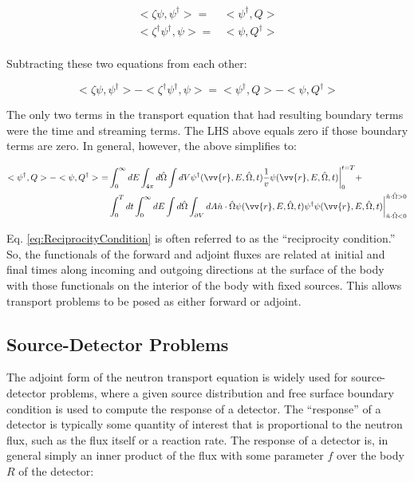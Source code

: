 \documentclass[10pt]{article}
\newcommand{\hO}{\hat{\Omega}}
\newcommand{\spa}{(\vv{r}, E, \hO, t)}
\begin{document}
\begin{flushleft}
\begin{equation}
\begin{aligned}
<\zeta\psi,\psi^\dagger>=& <\psi^\dagger,Q>\\
<\zeta^\dagger\psi^\dagger,\psi>=& <\psi,Q^\dagger>\\
\end{aligned}
\end{equation}
 
 Subtracting these two equations from each other:
 
 \begin{equation}
 <\zeta\psi,\psi^\dagger>-<\zeta^\dagger\psi^\dagger,\psi>=<\psi^\dagger,Q>-<\psi,Q^\dagger>
 \end{equation}

The only two terms in the transport equation that had resulting boundary terms were the time and streaming terms. The LHS above equals zero if those boundary terms are zero. In general, however, the above simplifies to:

\begin{equation}
\label{eq:ReciprocityCondition}
\begin{aligned}
<\psi^\dagger,Q>-<\psi,Q^\dagger> \ =& \int_0^\infty dE\int_{4\pi}d\hO  \int dV\psi^\dagger \spa \frac{1}{v} \psi\spa \biggr\rvert_{0}^{t=T} +\\
& \int_0^{T}dt\int_0^\infty dE\int d\hO  \int_{\partial V}dA\hat{n}\cdot\hO  \psi\spa \psi^\dagger\psi\spa \biggr\rvert_{\hat{n}\cdot\hO  <0}^{\hat{n}\cdot\hO  >0}
\end{aligned}
\end{equation}

Eq. \eqref{eq:ReciprocityCondition} is often referred to as the ``reciprocity condition.'' So, the functionals of the forward and adjoint fluxes are related at initial and final times along incoming and outgoing directions at the surface of the body with those functionals on the interior of the body with fixed sources. This allows transport problems to be posed as either forward or adjoint. 

\subsection{Source-Detector Problems}

The adjoint form of the neutron transport equation is widely used for source-detector problems, where a given source distribution and free surface boundary condition is used to compute the response of a detector. The ``response'' of a detector is typically some quantity of interest that is proportional to the neutron flux, such as the flux itself or a reaction rate. The response of a detector is, in general simply an inner product of the flux with some parameter \(f\) over the body \(R\) of the detector:


\end{flushleft}
\end{document}
